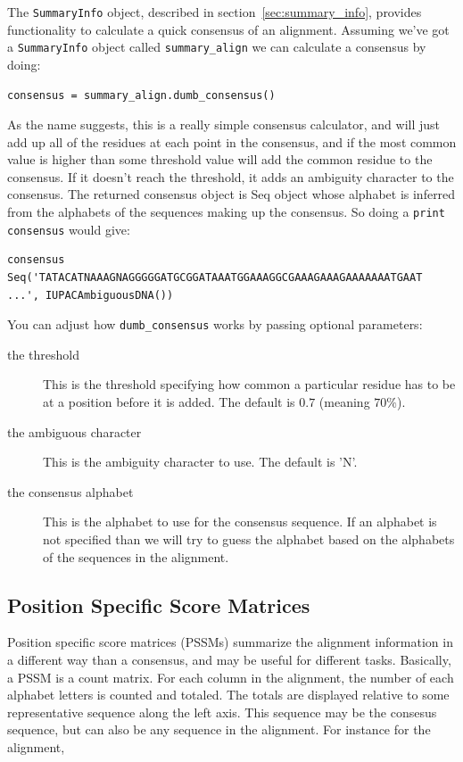 \documentclass{report}
\begin{document}
The \verb|SummaryInfo| object, described in section~\ref{sec:summary_info}, provides functionality to calculate a quick consensus of an alignment. Assuming we've got a \verb|SummaryInfo| object called \verb|summary_align| we can calculate a consensus by doing:

\begin{verbatim}
consensus = summary_align.dumb_consensus()
\end{verbatim}

As the name suggests, this is a really simple consensus calculator, and will just add up all of the residues at each point in the consensus, and if the most common value is higher than some threshold value will add the common residue to the consensus. If it doesn't reach the threshold, it adds an ambiguity character to the consensus. The returned consensus object is Seq object whose alphabet is inferred from the alphabets of the sequences making up the consensus. So doing a \verb|print consensus| would give:

\begin{verbatim}
consensus Seq('TATACATNAAAGNAGGGGGATGCGGATAAATGGAAAGGCGAAAGAAAGAAAAAAATGAAT
...', IUPACAmbiguousDNA())
\end{verbatim}

You can adjust how \verb|dumb_consensus| works by passing optional parameters:

\begin{description}
\item[the threshold] This is the threshold specifying how common a particular residue has to be at a position before it is added. The default is $0.7$ (meaning $70\%$).

\item[the ambiguous character] This is the ambiguity character to use. The default is 'N'.

\item[the consensus alphabet] This is the alphabet to use for the consensus sequence. If an alphabet is not specified than we will try to guess the alphabet based on the alphabets of the sequences in the alignment.
\end{description}

\subsection{Position Specific Score Matrices}
\label{sec:pssm}

Position specific score matrices (PSSMs) summarize the alignment information in a different way than a consensus, and may be useful for different tasks. Basically, a PSSM is a count matrix. For each column in the alignment, the number of each alphabet letters is counted and totaled. The totals are displayed relative to some representative sequence along the left axis. This sequence may be the consesus sequence, but can also be any sequence in the alignment. For instance for the alignment,
\end{document}
